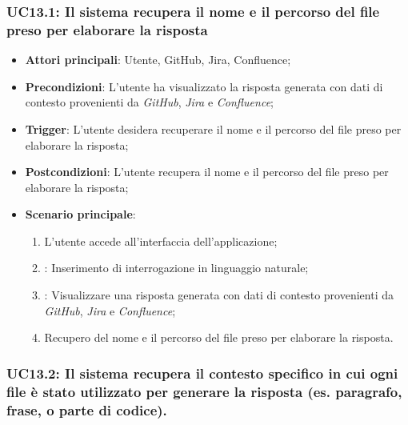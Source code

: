 \hypertarget{UC13.1}{}
\subsubsection{UC13.1: Il sistema recupera il nome e il percorso del file preso per elaborare la risposta}

\begin{itemize}
    \item \textbf{Attori principali}: Utente, GitHub, Jira, Confluence;
    \item \textbf{Precondizioni}: L'utente ha visualizzato la risposta generata con dati di contesto provenienti da \emph{GitHub}, \emph{Jira} e \emph{Confluence};
    \item \textbf{Trigger}: L'utente desidera recuperare il nome e il percorso del file preso per elaborare la risposta;
    \item \textbf{Postcondizioni}: L'utente recupera il nome e il percorso del file preso per elaborare la risposta;
    \item \textbf{Scenario principale}:
    \begin{enumerate}
        \item L'utente accede all'interfaccia dell'applicazione;
        \item {}: Inserimento di interrogazione in linguaggio naturale;
        \item {}: Visualizzare una risposta generata con dati di contesto provenienti da \emph{GitHub}, \emph{Jira} e \emph{Confluence};
        \item Recupero del nome e il percorso del file preso per elaborare la risposta.
    \end{enumerate}
\end{itemize}

\hypertarget{UC13.2}{}
\subsubsection{UC13.2: Il sistema recupera il contesto specifico in cui ogni file è stato utilizzato
per generare la risposta (es. paragrafo, frase, o parte di codice).}

